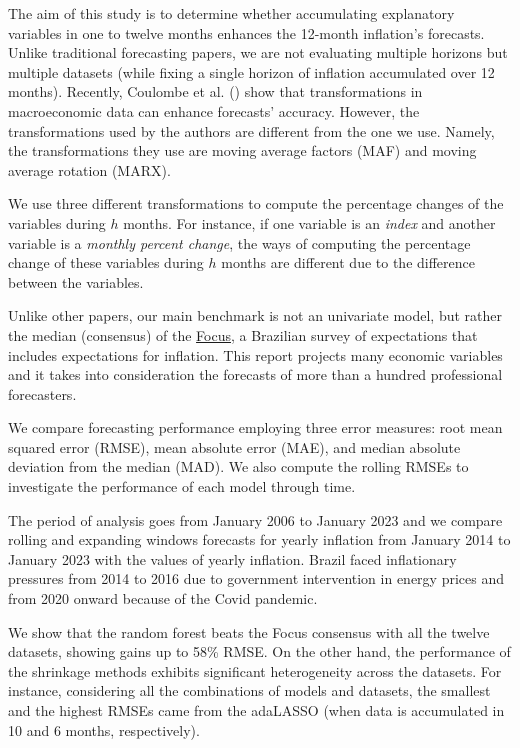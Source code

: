 \documentclass[12pt,openright,twoside,a4paper,brazil,english,emptypage,openany]{abntex2}
\begin{document}
The aim of this study is to determine whether  accumulating explanatory variables in one to twelve months enhances the 12-month inflation's forecasts. Unlike traditional forecasting papers, we are not evaluating multiple horizons but multiple datasets (while fixing a single horizon of inflation accumulated over 12 months). Recently, Coulombe et al. (\citeyear{coulombe2021macroeconomic}) show that transformations in macroeconomic data can enhance forecasts' accuracy. However, the transformations used by the authors are different from the one we use. Namely, the transformations they use are moving average factors (MAF) and moving average rotation (MARX). 

We use three different transformations to compute the percentage changes of the variables during $h$ months. For instance, if one variable is an \textit{index} and another variable is a \textit{monthly percent change}, the ways of computing the percentage change of these variables during $h$ months are different due to the difference between the variables.  

Unlike other papers, our main benchmark is not an univariate model, but rather the median (consensus) of the \href{https://www.bcb.gov.br/publicacoes/focus}{Focus}, a Brazilian survey of expectations that includes expectations for inflation. This report projects many economic variables and it takes into consideration the forecasts of more than a hundred professional forecasters.

We compare forecasting performance employing three error measures: root mean squared error (RMSE), mean absolute error (MAE), and median absolute deviation from the median (MAD). We also compute the rolling RMSEs  to investigate the performance of each model through time.

The period of analysis goes from January 2006 to January 2023 and we compare rolling and expanding windows forecasts for yearly inflation from January 2014 to January 2023 with the values of yearly inflation. Brazil faced inflationary pressures from 2014 to 2016 due to government intervention in energy prices and from 2020 onward because of the Covid pandemic.

We show that the random forest beats the Focus consensus with all the twelve datasets, showing gains up to 58\% RMSE. On the other hand, the performance of the shrinkage methods exhibits significant heterogeneity across the datasets. For instance, considering all the combinations of models and datasets, the smallest and the highest RMSEs came from the adaLASSO (when data is accumulated in 10 and 6 months, respectively).
\end{document}
